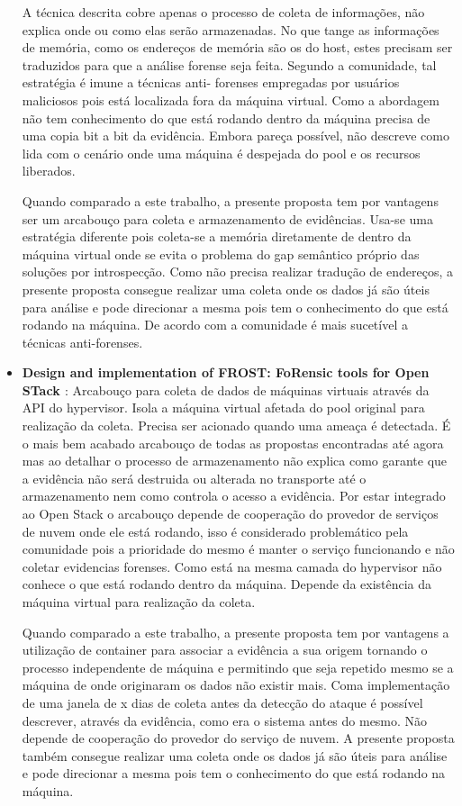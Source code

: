 \documentclass[
	12pt,				%
	openright,			%
	oneside,			%
	a4paper,			%
	english,			%
	french,				%
	spanish,			%
	brazil,				%
	]{abntex2}
\begin{document}
\begin{itemize}
A técnica descrita cobre apenas o processo de coleta de informações, não explica onde ou como elas serão armazenadas. No que tange as informações de memória, como os 
endereços de memória são os do host, estes precisam ser traduzidos para que a análise forense seja feita. Segundo a comunidade, tal estratégia é imune a técnicas anti-
forenses empregadas por usuários maliciosos pois está localizada fora da máquina virtual. Como a abordagem não tem conhecimento do que está rodando dentro da máquina 
precisa de uma copia bit a bit da evidência. Embora pareça possível, não descreve como lida com o cenário onde uma máquina é despejada do pool e os recursos liberados. 

Quando comparado a este trabalho, a presente proposta tem por vantagens ser um arcabouço para coleta e armazenamento de evidências. Usa-se uma estratégia 
diferente pois coleta-se a memória diretamente de dentro da máquina virtual onde se evita o problema do gap semântico próprio das soluções por introspecção. 
Como não precisa realizar tradução de endereços, a presente proposta consegue realizar uma coleta onde os dados já são úteis para análise e pode direcionar a mesma
pois tem o conhecimento do que está rodando na máquina. De acordo com a comunidade é mais sucetível a técnicas anti-forenses.\\

\item \textbf{Design and implementation of FROST: FoRensic tools for Open STack \cite{Dykstra2013} }: Arcabouço para coleta de dados de máquinas virtuais através da API do
hypervisor. Isola a máquina virtual afetada do pool original para realização da coleta. Precisa ser acionado quando uma ameaça é detectada. É o mais bem acabado arcabouço de
todas as propostas encontradas até agora mas ao detalhar o processo de armazenamento não explica como garante que a evidência não será destruida ou alterada no transporte
até o armazenamento nem como controla o acesso a evidência. Por estar integrado ao Open Stack o arcabouço depende de cooperação do provedor de serviços de nuvem onde ele 
está rodando, isso é considerado problemático pela comunidade pois a prioridade do mesmo é manter o serviço funcionando e não coletar evidencias forenses. Como está na
mesma camada do hypervisor não conhece o que está rodando dentro da máquina. Depende da existência da máquina virtual para realização da coleta.

Quando comparado a este trabalho, a presente proposta tem por vantagens a utilização de container para associar a evidência a sua origem tornando o processo 
independente de máquina e permitindo que seja repetido mesmo se a máquina de onde originaram os dados não existir mais. Coma implementação de uma janela 
de x dias de coleta antes da detecção do ataque é possível descrever, através da evidência, como era o sistema antes do mesmo. Não depende de cooperação do provedor 
do serviço de nuvem. A presente proposta também consegue realizar uma coleta onde os dados já são úteis para análise e pode direcionar a mesma pois tem o conhecimento 
do que está rodando na máquina. \\
  

\end{itemize}
\end{document}
